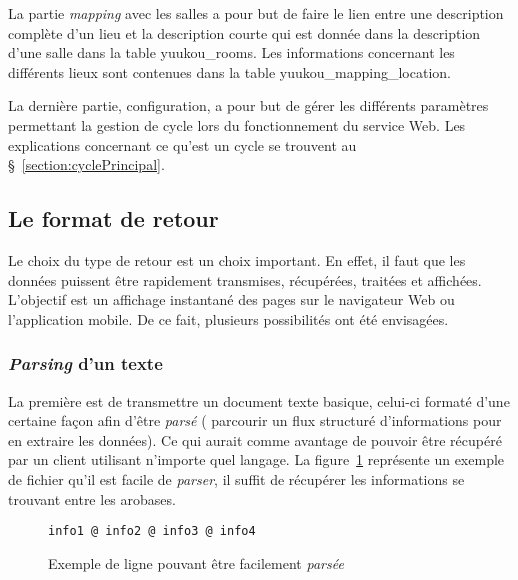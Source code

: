 La partie \textit{mapping} avec les salles a pour but de faire le lien entre une description compl\`ete d'un lieu et la description courte qui est donn\'ee dans la description d'une salle dans la table \textsf{yuukou\_rooms}.
Les informations concernant les diff\'erents lieux sont contenues dans la table \textsf{yuukou\_mapping\_location}.

La derni\`ere partie, configuration, a pour but de g\'erer les diff\'erents param\`etres permettant la gestion de cycle lors du fonctionnement du service Web. 
Les explications concernant ce qu'est un cycle se trouvent au \S~\ref{section:cyclePrincipal}.

\subsection{Le format de retour}
\label{section:formatRetour}

Le choix du type de retour est un choix important.
En effet, il faut que les donn\'ees puissent \^etre rapidement transmises, r\'ecup\'er\'ees, trait\'ees et affich\'ees.
L'objectif est un affichage instantan\'e des pages sur le navigateur Web ou l'application mobile.
De ce fait, plusieurs possibilit\'es ont \'et\'e envisag\'ees.

\subsubsection{{\og}\textit{Parsing}{\fg} d'un texte}

La premi\`ere est de transmettre un document texte basique, celui-ci format\'e d'une certaine fa\c{c}on afin d'\^etre \textit{pars\'e} ({\cad} parcourir un flux structur\'e d'informations pour en extraire les donn\'ees).
Ce qui aurait comme avantage de pouvoir \^etre r\'ecup\'er\'e par un client utilisant n'importe quel langage.
La figure~\ref{code:exemplePlaintext} repr\'esente un exemple de fichier qu'il est facile de \textit{parser}, il suffit de r\'ecup\'erer les informations se trouvant entre les arobases.

\vspace{0.20cm}

\begin{figure}[!ht]
	\begin{lstlisting}[language=plaintext]
info1 @ info2 @ info3 @ info4
	\end{lstlisting}
	
	\caption{Exemple de ligne pouvant \^etre facilement \textit{pars\'ee}}
	\label{code:exemplePlaintext}

\end{figure}

